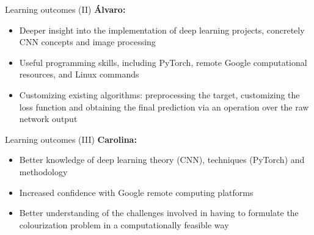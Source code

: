 \documentclass{beamer}
\begin{document}
\begin{frame}{Learning outcomes (II)}
  \textbf{Álvaro:}
    \begin{itemize}
      \item Deeper insight into the implementation of deep learning projects,
            concretely CNN concepts and image processing
      \item Useful programming skills, including PyTorch, remote Google
            computational resources, and Linux commands
      \item Customizing existing algorithms: preprocessing the target,
            customizing the loss function and obtaining the final prediction via
            an operation over the raw network output
    \end{itemize}
\end{frame}

\begin{frame}{Learning outcomes (III)}
  \textbf{Carolina:}
    \begin{itemize}
      \item Better knowledge of deep learning theory (CNN), techniques
            (PyTorch) and methodology
      \item Increased confidence with Google remote computing platforms
      \item Better understanding of the challenges involved in having to
            formulate the colourization problem in a computationally feasible
            way
    \end{itemize}
\end{frame}
\end{document}
